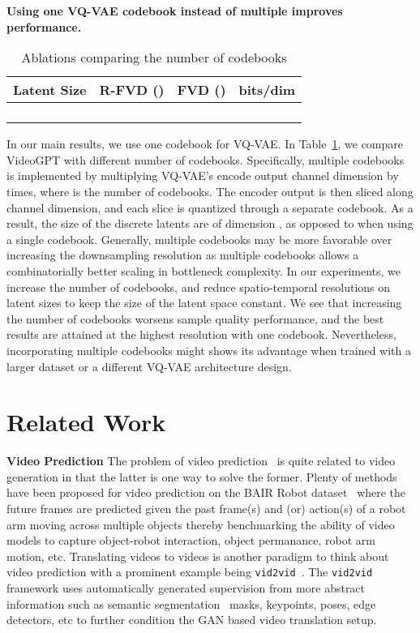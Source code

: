 \documentclass{article}
\begin{document}
\textbf{Using one VQ-VAE codebook instead of multiple improves performance.}
\begin{table}[H]
\caption{Ablations comparing the number of codebooks}
\label{table:abl_n_codebooks}
\begin{tabular}{@{}cccc@{}}
\toprule
Latent Size                    & R-FVD () & FVD () & bits/dim \\ \midrule
    &                &     &       \\
 &                &                    &                 \\
 &                &     &      \\
 &                &     &      \\ \bottomrule
\end{tabular}
\end{table}
In our main results, we use one codebook for VQ-VAE. In Table~\ref{table:abl_n_codebooks}, we compare VideoGPT with different number of codebooks. Specifically, multiple codebooks is implemented by multiplying VQ-VAE's encode output channel dimension by  times, where  is the number of codebooks. The encoder output is then sliced along channel dimension, and each slice is quantized through a separate codebook. As a result, the size of the discrete latents are of dimension , as opposed to  when using a single codebook. Generally, multiple codebooks may be more favorable over increasing the downsampling resolution as multiple codebooks allows a combinatorially better scaling in bottleneck complexity. In our experiments, we increase the number of codebooks, and reduce spatio-temporal resolutions on latent sizes to keep the size of the latent space constant. We see that increasing the number of codebooks worsens sample quality performance, and the best results are attained at the highest resolution with one codebook. Nevertheless, incorporating multiple codebooks might shows its advantage when trained with a larger dataset or a different VQ-VAE architecture design.  
\section{Related Work}


{\bf Video Prediction}
The problem of video prediction~\citep{srivastava2015unsupervised} is quite related to video generation in that the latter is one way to solve the former.  
Plenty of methods have been proposed for video prediction on the BAIR Robot dataset~\citep{finn2016unsupervised, ebert2017self, babaeizadeh2017stochastic, denton2017unsupervised, denton2018stochastic, lee2018stochastic} where the future frames are predicted given the past frame(s) and (or) action(s) of a robot arm moving across multiple objects thereby benchmarking the ability of video models to capture object-robot interaction, object permanance, robot arm motion, etc. Translating videos to videos is another paradigm to think about video prediction with a prominent example being \texttt{vid2vid}~\cite{wang2018video}. The \texttt{vid2vid} framework uses automatically generated supervision from more abstract information such as semantic segmentation~\citep{Luc_2017_ICCV} masks, keypoints, poses, edge detectors, etc to further condition the GAN based video translation setup.
\end{document}
